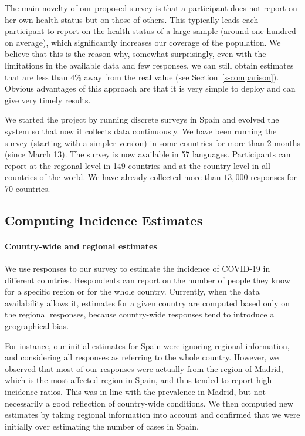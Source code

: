 \documentclass{article}
\begin{document}
The main novelty of our proposed survey is that a participant does not report on her own health status but on those of others. This typically leads each participant to report on the health status of a large sample (around one hundred on average), which significantly increases our coverage of the population. We believe that this is the reason why, 
somewhat surprisingly, even with the limitations in the available data and few responses, we can still obtain estimates that are less than 4\% away from the real value (see Section~\ref{s-comparison}). Obvious advantages of this approach are that it is very simple to deploy and can give very timely results.

We started the project by running discrete surveys in Spain and evolved the system so that now it collects data continuously. 
We have been running the survey (starting with a simpler version) in some countries for more than 2 months (since March 13). The survey is now available in 57 languages. Participants can report at the regional level in 149 countries and at the country level in all countries of the world. We have already collected more than $13,000$ responses for 70 countries.

\subsection{Computing Incidence Estimates}

\paragraph{Country-wide and regional estimates} 
We use responses to our survey to estimate the incidence of COVID-19 in different countries. Respondents can report on the number of people they know for a specific region or for the whole country. 
Currently, when the data availability allows it,  estimates for a given country are computed based only on the regional responses, because country-wide responses tend to introduce a geographical bias. 

For instance, our initial estimates for Spain were ignoring regional information, and considering all responses as referring to the whole country. However, we observed that most of our responses were actually from the region of Madrid, which is the most affected region in Spain, and thus tended to report high incidence ratios. This was in line with the prevalence in Madrid, but not necessarily a good reflection of country-wide conditions. We then computed new estimates by taking regional information into account and confirmed that we were initially over estimating the number of cases in Spain. 
\end{document}
